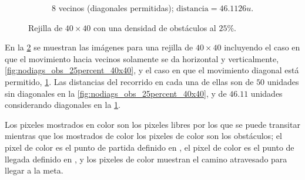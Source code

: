 \begin{enumerate}
\begin{solution}
\begin{figure}[ht!]
\begin{subfigure}{0.4\textwidth}
                \caption{8 vecinos (diagonales permitidas); $\text{distancia} = 46.1126 u$.}
                \label{fig:diags_obs_25percent_40x40}
            \end{subfigure}
            \caption{Rejilla de $40 \times 40$ con una densidad de obstáculos al $25\%$.}
            \label{fig:rejilla_40x40}
        \end{figure}

        En la \cref{fig:rejilla_40x40} se muestran las imágenes para una rejilla de $40 \times 40$ incluyendo el caso en que el movimiento hacia vecinos solamente se da horizontal y verticalmente, \cref{fig:nodiags_obs_25percent_40x40}, y el caso en que el movimiento diagonal está permitido, \cref{fig:diags_obs_25percent_40x40}. Las distancias del recorrido en cada una de ellas son de $50$ unidades sin diagonales en la \cref{fig:nodiags_obs_25percent_40x40}, y de $46.11$ unidades considerando diagonales en la \cref{fig:diags_obs_25percent_40x40}.

        Los pixeles mostrados en color  son los pixeles libres por los que se puede transitar mientras que los mostrados de color los pixeles de color  son los obstáculos; el pixel de color  es el punto de partida definido en , el pixel de color  es el punto de llegada definido en , y los pixeles de color  muestran el camino atravesado para llegar a la meta.


\end{solution}
\end{enumerate}
